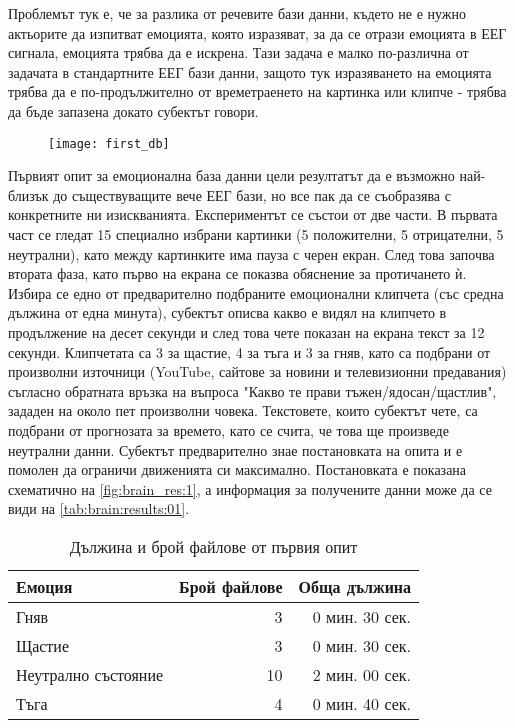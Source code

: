 \documentclass[main.tex]{subfiles}
\begin{document}
Проблемът тук е, че за разлика от речевите бази данни, където не е нужно актьорите да изпитват емоцията, която изразяват, за да се отрази емоцията в ЕЕГ сигнала, емоцията трябва да е искрена. Тази задача е малко по-различна от задачата в стандартните ЕЕГ бази данни, защото тук изразяването на емоцията трябва да е по-продължително от времетраенето на картинка или клипче - трябва да бъде запазена докато субектът говори.

\begin{figure}[ht]%
    \texttt{[image: first\_db]}%
    \label{fig:brain_res:1}
\end{figure}

Първият опит за емоционална база данни цели резултатът да е възможно най-близък до съществуващите вече ЕЕГ бази, но все пак да се съобразява с конкретните ни изискванията. Експериментът се състои от две части.
В първата част се гледат 15 специално избрани картинки (5 положителни, 5 отрицателни, 5 неутрални), като между картинките има пауза с черен екран. След това започва втората фаза, като първо на екрана се показва обяснение за протичането ѝ. Избира се едно от предварително подбраните емоционални клипчета (със средна дължина от една минута), субектът описва какво е видял на клипчето в продължение на десет секунди и след това чете показан на екрана текст за 12 секунди.
Клипчетата са 3 за щастие, 4 за тъга и 3 за гняв, като са подбрани от произволни източници (YouTube, сайтове за новини и телевизионни предавания) съгласно обратната връзка на въпроса "Какво те прави тъжен/ядосан/щастлив", зададен на около пет произволни човека. Текстовете, които субектът чете, са подбрани от прогнозата за времето, като се счита, че това ще произведе неутрални данни.
Субектът предварително знае постановката на опита и е помолен да ограничи движенията си максимално. Постановката е показана схематично на \autoref{fig:brain_res:1}, а информация за получените данни може да се види на \autoref{tab:brain:results:01}.

\begin{table}[h]
    \begin{center}
    \begin{tabular}{|l|r|r|} 
        \hline
        Емоция & Брой файлове & Обща дължина\\ 
        \hline
        Гняв & 3 & 0 мин. 30 сек.\\ 
        Щастие & 3 & 0 мин. 30 сек.\\ 
        Неутрално състояние & 10 & 2 мин. 00 сек. \\ 
        Тъга & 4 & 0 мин. 40 сек. \\ 
        \hline
    \end{tabular}
    \caption{Дължина и брой файлове от първия опит}
    \label{tab:brain:results:01}
    \end{center}
\end{table}
\end{document}
